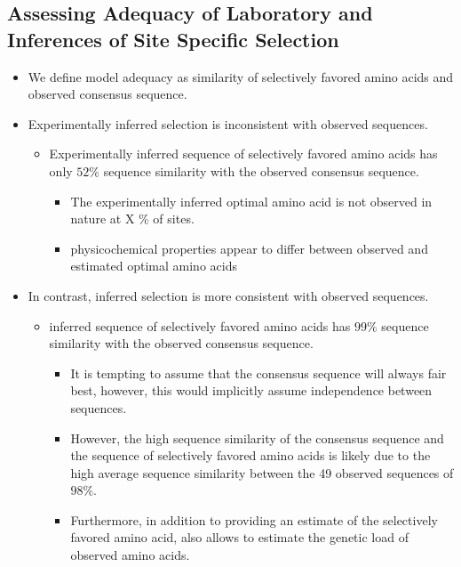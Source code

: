 \documentclass[12pt]{article}
\begin{document}
\subsection*{Assessing Adequacy of Laboratory and \selac Inferences of Site Specific Selection}
\begin{itemize}
	\item We define model adequacy as similarity of selectively favored amino acids and observed consensus sequence.
	\item Experimentally inferred selection is inconsistent with observed sequences.
	\begin{itemize}
		\item Experimentally inferred sequence of selectively favored amino acids has only $52 \%$ sequence similarity with the observed consensus sequence.
		\begin{itemize}
			\item The experimentally inferred optimal amino acid is not observed in nature at X \% of sites.
			\item physicochemical properties appear to differ between observed and estimated optimal amino acids
		\end{itemize}
	\end{itemize}
	\item In contrast, \selac inferred selection is more consistent with observed sequences.
	\begin{itemize}
		\item \selac inferred sequence of selectively favored amino acids has $99 \%$ sequence similarity with the observed consensus sequence.
		\begin{itemize}
			\item It is tempting to assume that the consensus sequence will always fair best, however, this would implicitly assume independence between sequences.
			\item However, the high sequence similarity of the consensus sequence and the sequence of selectively favored amino acids is likely due to the high average sequence similarity between the 49 observed sequences of $98 \%$.
			\item Furthermore, in addition to providing an estimate of the selectively favored amino acid, \selac also allows to estimate the genetic load of observed amino acids.
		\end{itemize}
	\end{itemize}
\end{itemize}
\end{document}
